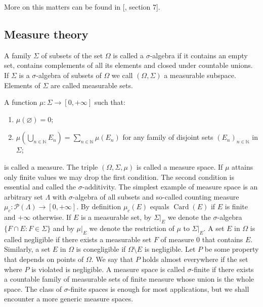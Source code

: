 More on this matters can be found in [\cite{BourbElemMathGenTopLivIII}, section
7].



\subsection{
  Measure theory}\label{SubSectionMeasureTheory}

A family $\Sigma$ of subsets of the set $\Omega$ is called a $\sigma$-algebra if
it contains an empty set, contains complements of all its elements and closed
under countable unions. If $\Sigma$ is a $\sigma$-algebra of subsets of $\Omega$
we call $(\Omega,\Sigma)$ a measurable subspace. Elements of $\Sigma$ are called
measurable sets. 

A function $\mu:\Sigma\to[0,+\infty]$ such that:  
\begin{enumerate}[label = (\roman*)]
  \item $\mu(\varnothing)=0$; 

  \item $\mu\left(\bigcup\limits_{n\in\mathbb{N}} E_n\right)
  =\sum\limits_{n\in\mathbb{N}}\mu(E_n)$ for any family of disjoint sets
  ${(E_n)}_{n\in\mathbb{N}}$ in $\Sigma$; 
\end{enumerate}

is called a measure. The triple $(\Omega,\Sigma,\mu)$ is called a measure space.
If $\mu$ attains only finite values we may drop the first condition. The second
condition is essential and called the $\sigma$-additivity. The simplest example
of measure space is an  arbitrary set $\Lambda$ with $\sigma$-algebra of all
subsets and so-called counting measure
$\mu_c:\mathcal{P}(\Lambda)\to[0,+\infty]$. By definition $\mu_c(E)$ equals
$\operatorname{Card}(E)$ if $E$ is finite and $+\infty$ otherwise. If $E$ is a
measurable set, by $\Sigma|_E$ we denote the $\sigma$-algebra $ \{F\cap
E:F\in\Sigma \}$ and by $\mu|_E$ we denote the restriction of $\mu$ to
$\Sigma|_E$. A set $E$ in $\Omega$ is called negligible if there exists a
measurable set $F$ of measure $0$ that contains $E$. Similarly, a set $E$ in
$\Omega$ is conegligible if $\Omega\setminus E$ is negligible. Let $P$ be some
property that depends on points of $\Omega$. We say that $P$ holds almost
everywhere if the set where $P$ is violated is negligible. A measure space is
called $\sigma$-finite if there exists a countable family of measurable sets of
finite measure whose union is the whole space. The class of $\sigma$-finite
spaces is enough for most applications, but we shall encounter a more generic
measure spaces.

